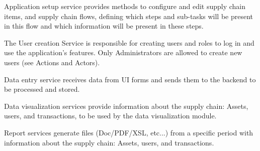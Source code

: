 Application setup service provides methods to configure and edit supply chain items, and supply chain flows, defining which steps and sub-tasks will be present in this flow and which information will be present in these steps.

The User creation Service is responsible for creating users and roles to log in and use the application’s features. Only Administrators are allowed to create new users (see Actions and Actors).

Data entry service receives data from UI forms and sends them to the backend to be processed and stored.

Data visualization services provide information about the supply chain: Assets, users, and transactions, to be used by the data visualization module.

Report services generate files (Doc/PDF/XSL, etc...) from a specific period with information about the supply chain: Assets, users, and transactions.